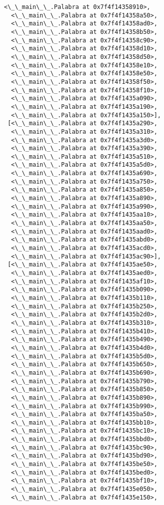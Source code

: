 \documentclass[12pt,a4paper,table]{article}
\begin{document}
\begin{tcolorbox}[breakable, size=fbox, boxrule=.5pt, pad at break*=1mm, opacityfill=0]
\begin{Verbatim}[commandchars=\\\{\}]
  <\_\_main\_\_.Palabra at 0x7f4f14358910>,
  <\_\_main\_\_.Palabra at 0x7f4f14358a50>,
  <\_\_main\_\_.Palabra at 0x7f4f14358ad0>,
  <\_\_main\_\_.Palabra at 0x7f4f14358b50>,
  <\_\_main\_\_.Palabra at 0x7f4f14358c90>,
  <\_\_main\_\_.Palabra at 0x7f4f14358d10>,
  <\_\_main\_\_.Palabra at 0x7f4f14358d50>,
  <\_\_main\_\_.Palabra at 0x7f4f14358e10>,
  <\_\_main\_\_.Palabra at 0x7f4f14358e50>,
  <\_\_main\_\_.Palabra at 0x7f4f14358f50>,
  <\_\_main\_\_.Palabra at 0x7f4f14358f10>,
  <\_\_main\_\_.Palabra at 0x7f4f1435a090>,
  <\_\_main\_\_.Palabra at 0x7f4f1435a190>,
  <\_\_main\_\_.Palabra at 0x7f4f1435a150>],
 [<\_\_main\_\_.Palabra at 0x7f4f1435a290>,
  <\_\_main\_\_.Palabra at 0x7f4f1435a310>,
  <\_\_main\_\_.Palabra at 0x7f4f1435a3d0>,
  <\_\_main\_\_.Palabra at 0x7f4f1435a390>,
  <\_\_main\_\_.Palabra at 0x7f4f1435a510>,
  <\_\_main\_\_.Palabra at 0x7f4f1435a5d0>,
  <\_\_main\_\_.Palabra at 0x7f4f1435a690>,
  <\_\_main\_\_.Palabra at 0x7f4f1435a750>,
  <\_\_main\_\_.Palabra at 0x7f4f1435a850>,
  <\_\_main\_\_.Palabra at 0x7f4f1435a890>,
  <\_\_main\_\_.Palabra at 0x7f4f1435a990>,
  <\_\_main\_\_.Palabra at 0x7f4f1435aa10>,
  <\_\_main\_\_.Palabra at 0x7f4f1435aa50>,
  <\_\_main\_\_.Palabra at 0x7f4f1435aad0>,
  <\_\_main\_\_.Palabra at 0x7f4f1435abd0>,
  <\_\_main\_\_.Palabra at 0x7f4f1435acd0>,
  <\_\_main\_\_.Palabra at 0x7f4f1435ac90>],
 [<\_\_main\_\_.Palabra at 0x7f4f1435ae50>,
  <\_\_main\_\_.Palabra at 0x7f4f1435aed0>,
  <\_\_main\_\_.Palabra at 0x7f4f1435af10>,
  <\_\_main\_\_.Palabra at 0x7f4f1435b090>,
  <\_\_main\_\_.Palabra at 0x7f4f1435b110>,
  <\_\_main\_\_.Palabra at 0x7f4f1435b250>,
  <\_\_main\_\_.Palabra at 0x7f4f1435b2d0>,
  <\_\_main\_\_.Palabra at 0x7f4f1435b310>,
  <\_\_main\_\_.Palabra at 0x7f4f1435b410>,
  <\_\_main\_\_.Palabra at 0x7f4f1435b490>,
  <\_\_main\_\_.Palabra at 0x7f4f1435b4d0>,
  <\_\_main\_\_.Palabra at 0x7f4f1435b5d0>,
  <\_\_main\_\_.Palabra at 0x7f4f1435b650>,
  <\_\_main\_\_.Palabra at 0x7f4f1435b690>,
  <\_\_main\_\_.Palabra at 0x7f4f1435b790>,
  <\_\_main\_\_.Palabra at 0x7f4f1435b850>,
  <\_\_main\_\_.Palabra at 0x7f4f1435b890>,
  <\_\_main\_\_.Palabra at 0x7f4f1435b990>,
  <\_\_main\_\_.Palabra at 0x7f4f1435ba50>,
  <\_\_main\_\_.Palabra at 0x7f4f1435bb10>,
  <\_\_main\_\_.Palabra at 0x7f4f1435bc10>,
  <\_\_main\_\_.Palabra at 0x7f4f1435bbd0>,
  <\_\_main\_\_.Palabra at 0x7f4f1435bc90>,
  <\_\_main\_\_.Palabra at 0x7f4f1435bd90>,
  <\_\_main\_\_.Palabra at 0x7f4f1435be50>,
  <\_\_main\_\_.Palabra at 0x7f4f1435bed0>,
  <\_\_main\_\_.Palabra at 0x7f4f1435bf10>,
  <\_\_main\_\_.Palabra at 0x7f4f1435e050>,
  <\_\_main\_\_.Palabra at 0x7f4f1435e150>,

\end{Verbatim}
\end{tcolorbox}
\end{document}
